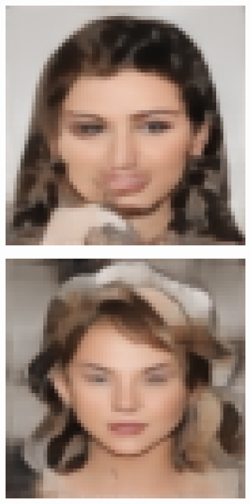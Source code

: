 \documentclass{IEEEcsmag}
\begin{document}
\begin{figure}[ht]
\begin{subfigure}{0.12\textwidth}
    \end{subfigure}
    \begin{subfigure}{0.12\textwidth}
        \includegraphics[width=\linewidth]{Random sketch/generated_images/image2.jpeg_CVAE.png}
    \end{subfigure}
    \begin{subfigure}{0.12\textwidth}
        \includegraphics[width=\linewidth]{Digital sketches/generated_images/image7.jpeg_CVAE.png}
    \end{subfigure}


\end{figure}
\end{document}
